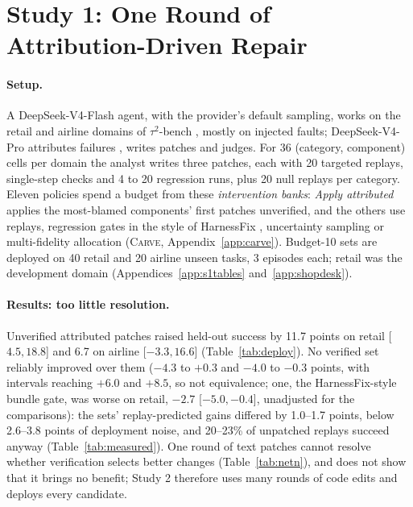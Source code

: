 \documentclass[11pt]{article}
\newcommand{\carve}{\textsc{Carve}}
\begin{document}
\section{Study 1: One Round of Attribution-Driven Repair}
\label{sec:study1}

\paragraph{Setup.} A DeepSeek-V4-Flash agent, with the provider's default sampling, works on the retail and airline domains of $\tau^2$-bench \citep{yao2024taubench,barres2025tau2}, mostly on injected faults; DeepSeek-V4-Pro attributes failures \citep{wan2024tntllm}, writes patches and judges. For 36 (category, component) cells per domain the analyst writes three patches, each with 20 targeted replays, single-step checks and 4 to 20 regression runs, plus 20 null replays per category. Eleven policies spend a budget from these \emph{intervention banks}: \emph{Apply attributed} applies the most-blamed components' first patches unverified, and the others use replays, regression gates in the style of HarnessFix \citep{chen2026harnessfix}, uncertainty sampling or multi-fidelity allocation (\carve{}, Appendix~\ref{app:carve}). Budget-10 sets are deployed on 40 retail and 20 airline unseen tasks, 3 episodes each; retail was the development domain (Appendices~\ref{app:s1tables} and~\ref{app:shopdesk}).

\paragraph{Results: too little resolution.} Unverified attributed patches raised held-out success by 11.7 points on retail [$4.5,18.8$] and 6.7 on airline [$-3.3,16.6$] (Table~\ref{tab:deploy}). No verified set reliably improved over them ($-4.3$ to $+0.3$ and $-4.0$ to $-0.3$ points, with intervals reaching $+6.0$ and $+8.5$, so not equivalence; one, the HarnessFix-style bundle gate, was worse on retail, $-2.7$ [$-5.0,-0.4$], unadjusted for the comparisons): the sets' replay-predicted gains differed by 1.0--1.7 points, below 2.6--3.8 points of deployment noise, and 20--23\% of unpatched replays succeed anyway (Table~\ref{tab:measured}). One round of text patches cannot resolve whether verification selects better changes (Table~\ref{tab:netn}), and does not show that it brings no benefit; Study 2 therefore uses many rounds of code edits and deploys every candidate.
\end{document}
